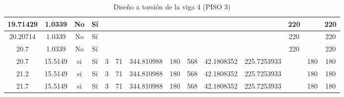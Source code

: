 \begin{table}[H]
{\begin{tabular}{|c|c|c|c|c|c|c|c|c|c|c|c|c|c|}
\hline
19.71429 & 1.0339 & No  & Sí  &     &     &     &     &     &     &     & 220 &     & 220 \bigstrut\\
\hline
20.20714 & 1.0339 & No  & Sí  &     &     &     &     &     &     &     & 220 &     & 220 \bigstrut\\
\hline
20.7 & 1.0339 & No  & Sí  &     &     &     &     &     &     &     & 220 &     & 220 \bigstrut\\
\hline
20.7 & 15.5149 & si  & Sí  & 3   & 71  & 344.810988 & 180 & 568 & 42.1808352 & 225.7253933 &     & 180 & 180 \bigstrut\\
\hline
21.2 & 15.5149 & si  & Sí  & 3   & 71  & 344.810988 & 180 & 568 & 42.1808352 & 225.7253933 &     & 180 & 180 \bigstrut\\
\hline
21.7 & 15.5149 & si  & Sí  & 3   & 71  & 344.810988 & 180 & 568 & 42.1808352 & 225.7253933 &     & 180 & 180 \bigstrut\\
\hline
\end{tabular}%

  }
      \caption{Diseño a torsión de la viga 4 (PISO 3) }
  \label{tab:T VG4 P3 }%
\end{table}%
